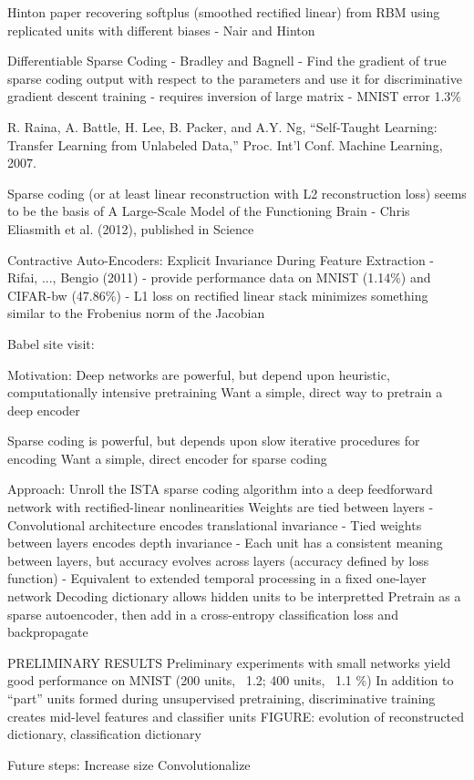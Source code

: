 Hinton paper recovering softplus (smoothed rectified linear) from RBM using replicated units with different biases - Nair and Hinton

Differentiable Sparse Coding - Bradley and Bagnell - Find the gradient of true sparse coding output with respect to the parameters and use it for discriminative gradient descent training - requires inversion of large matrix - MNIST error 1.3\%


R. Raina, A. Battle, H. Lee, B. Packer, and A.Y. Ng, “Self-Taught Learning: Transfer Learning from Unlabeled Data,” Proc. Int’l Conf. Machine Learning, 2007.

Sparse coding (or at least linear reconstruction with L2 reconstruction loss) seems to be the basis of A Large-Scale Model of the Functioning Brain - Chris Eliasmith et al. (2012), published in Science


Contractive Auto-Encoders: Explicit Invariance During Feature Extraction - Rifai, ..., Bengio (2011) - provide performance data on MNIST (1.14\%) and CIFAR-bw (47.86\%) - L1 loss on rectified linear stack minimizes something similar to the Frobenius norm of the Jacobian



Babel site visit:

Motivation:
Deep networks are powerful, but depend upon heuristic, computationally intensive pretraining
Want a simple, direct way to pretrain a deep encoder

Sparse coding is powerful, but depends upon slow iterative procedures for encoding
Want a simple, direct encoder for sparse coding


Approach:
Unroll the ISTA sparse coding algorithm into a deep feedforward network with rectified-linear nonlinearities
Weights are tied between layers
  - Convolutional architecture encodes translational invariance
  - Tied weights between layers encodes depth invariance
  - Each unit has a consistent meaning between layers, but accuracy evolves across layers (accuracy defined by loss function)
  - Equivalent to extended temporal processing in a fixed one-layer network
Decoding dictionary allows hidden units to be interpretted
Pretrain as a sparse autoencoder, then add in a cross-entropy classification loss and backpropagate

PRELIMINARY RESULTS
Preliminary experiments with small networks yield good performance on MNIST (200 units, ~1.2; 400 units, ~1.1 \%)
In addition to ``part'' units formed during unsupervised pretraining, discriminative training  creates mid-level features and classifier units
FIGURE: evolution of reconstructed dictionary, classification dictionary

Future steps:
Increase size
Convolutionalize